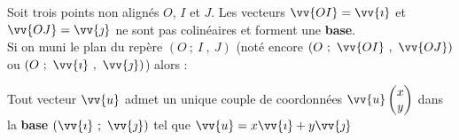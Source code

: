 \documentclass[main.tex]{subfiles}
\begin{document}
\begin{definition} Soit trois points non alignés $O$, $I$ et $J$. Les vecteurs $\vv{OI}=\vv{\imath}$ et $\vv{OJ}=\vv{\jmath}$ ne sont pas colinéaires et forment une \textbf{base}.\\
	Si on muni le plan du repère   $(O~;~I~,~J)$ (noté encore $(O~;~\vv{OI}~,~\vv{OJ})$ ou $(O~;~\vv{\imath}~,~\vv{\jmath})$) alors :
	
		\noindent Tout vecteur $\vv{u}$ admet un unique couple de coordonnées $\vv{u}\begin{pmatrix}
			x\\ y
		\end{pmatrix}$ dans la \textbf{base} $(\vv{\imath}~;~\vv{\jmath})$ tel que 
		$\vv{u}=x\vv{\imath}+y\vv{\jmath}$ 
\end{definition} 
\end{document}
